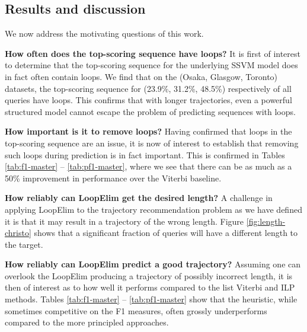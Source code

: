 %
\subsection{Results and discussion}

We now address the motivating questions of this work.

\textbf{How often does the top-scoring sequence have loops?}
It is first of interest to determine that the top-scoring sequence for the underlying SSVM model does in fact often contain loops.
We find that on the (Osaka, Glasgow, Toronto) datasets, the top-scoring sequence for (23.9\%, 31.2\%, 48.5\%) respectively of all queries have loops.
This confirms that with longer trajectories, even a powerful structured model cannot escape the problem of predicting sequences with loops.


\textbf{How important is it to remove loops?}
Having confirmed that loops in the top-scoring sequence are an issue,
it is now of interest to establish that removing such loops during prediction is in fact important.
This is confirmed in Tables \ref{tab:f1-master} -- \ref{tab:pf1-master},
where we see that there can be as much as a 50\% improvement in performance over the {\sc Viterbi} baseline.

\textbf{How reliably can {\sc LoopElim} get the desired length?}
A challenge in applying {\sc LoopElim} to the trajectory recommendation problem as we have defined it
is that it may result in a trajectory of the wrong length.
Figure \ref{fig:length-christo} shows that a significant fraction of queries will have a different length to the target.

\textbf{How reliably can {\sc LoopElim} predict a good trajectory?}
Assuming one can overlook the {\sc LoopElim} producing a trajectory of possibly incorrect length,
it is then of interest as to how well it performs compared to the list Viterbi and ILP methods.
Tables \ref{tab:f1-master} -- \ref{tab:pf1-master} show that the heuristic, while sometimes competitive on the F1 measures, often
grossly underperforms compared to the more principled approaches.


